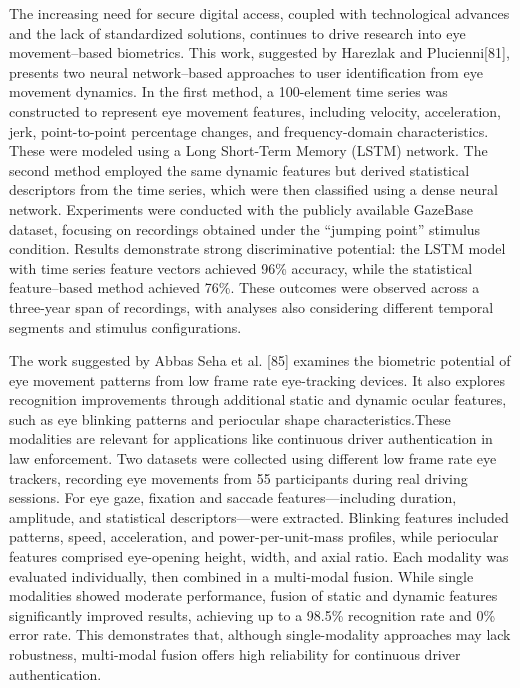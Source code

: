 \documentclass{article}
\begin{document}
The increasing need for secure digital access, coupled with technological advances and the lack of standardized solutions, continues to drive research into eye movement–based biometrics.
This work, suggested by Harezlak and Plucienni[81], presents two neural network–based approaches to user identification from eye movement dynamics.
In the first method, a 100-element time series was constructed to represent eye movement features, including velocity, acceleration, jerk, point-to-point percentage changes, and frequency-domain characteristics. 
These were modeled using a Long Short-Term Memory (LSTM) network. 
The second method employed the same dynamic features but derived statistical descriptors from the time series, which were then classified using a dense neural network.
Experiments were conducted with the publicly available GazeBase dataset, focusing on recordings obtained under the “jumping point” stimulus condition. 
Results demonstrate strong discriminative potential: the LSTM model with time series feature vectors achieved 96\% accuracy, while the statistical feature–based method achieved 76\%. 
These outcomes were observed across a three-year span of recordings, with analyses also considering different temporal segments and stimulus configurations.

The work suggested by Abbas Seha et al. [85] examines the biometric potential of eye movement patterns from low frame rate eye-tracking devices.
It also explores recognition improvements through additional static and dynamic ocular features, such as eye blinking patterns and periocular shape characteristics.These modalities are relevant for applications like continuous driver authentication in law enforcement. 
Two datasets were collected using different low frame rate eye trackers, recording eye movements from 55 participants during real driving sessions. 
For eye gaze, fixation and saccade features—including duration, amplitude, and statistical descriptors—were extracted.
Blinking features included patterns, speed, acceleration, and power-per-unit-mass profiles, while periocular features comprised eye-opening height, width, and axial ratio. 
Each modality was evaluated individually, then combined in a multi-modal fusion. While single modalities showed moderate performance, fusion of static and dynamic features significantly improved results, achieving up to a 98.5\% recognition rate and 0\% error rate. 
This demonstrates that, although single-modality approaches may lack robustness, multi-modal fusion offers high reliability for continuous driver authentication.
\end{document}

